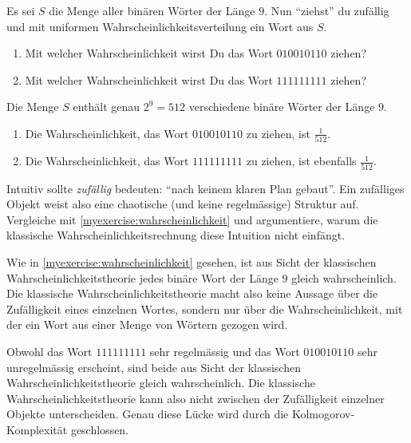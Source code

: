 \begin{myexercise}\label{myexercise:wahrscheinlichkeit}
	Es sei $S$ die Menge aller binären Wörter der Länge $9$. Nun \enquote{ziehst} du zufällig und mit uniformen Wahrscheinlichkeitsverteilung ein Wort aus $S$.
	\begin{enumerate}
		\item Mit welcher Wahrscheinlichkeit wirst Du das Wort $010010110$ ziehen?
		\item Mit welcher Wahrscheinlichkeit wirst Du das Wort $111111111$ ziehen?
	\end{enumerate}
	\begin{myanswer}
		Die Menge $S$ enthält genau $2^9 = 512$ verschiedene binäre Wörter der Länge $9$.
		\begin{enumerate}
			\item Die Wahrscheinlichkeit, das Wort $010010110$ zu ziehen, ist $\frac{1}{512}$.
			\item Die Wahrscheinlichkeit, das Wort $111111111$ zu ziehen, ist ebenfalls $\frac{1}{512}$.
		\end{enumerate}
	\end{myanswer}
\end{myexercise}

\begin{myexercise}
	Intuitiv sollte \textit{zufällig} bedeuten: \enquote{nach keinem klaren Plan gebaut}. Ein zufälliges Objekt weist also eine chaotische (und keine regelmässige) Struktur auf. Vergleiche mit \cref{myexercise:wahrscheinlichkeit} und argumentiere, warum die klassische Wahrscheinlichkeitsrechnung diese Intuition nicht einfängt.
\begin{myanswer}
	Wie in \cref{myexercise:wahrscheinlichkeit} gesehen, ist aus Sicht der klassischen Wahrscheinlichkeitstheorie jedes binäre Wort der Länge $9$ gleich wahrscheinlich. Die klassische Wahrscheinlichkeitstheorie macht also keine Aussage über die Zufälligkeit eines einzelnen Wortes, sondern nur über die Wahrscheinlichkeit, mit der ein Wort aus einer Menge von Wörtern gezogen wird.
	
	Obwohl das Wort $111111111$ sehr regelmässig und das Wort $010010110$ sehr unregelmässig erscheint, sind beide aus Sicht der klassischen Wahrscheinlichkeitstheorie gleich wahrscheinlich. Die klassische Wahrscheinlichkeitstheorie kann also nicht zwischen der Zufälligkeit einzelner Objekte unterscheiden. Genau diese Lücke wird durch die Kolmogorov-Komplexität geschlossen.
\end{myanswer}
\end{myexercise}

